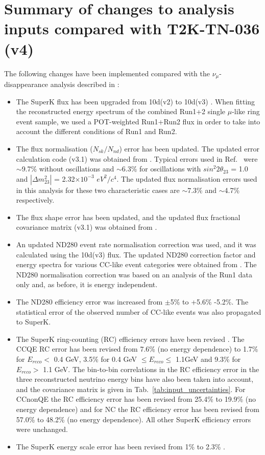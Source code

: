 \section {Summary of changes to analysis inputs compared with T2K-TN-036 (v4) }
\label{sec:analysis_modifications}

The following changes have been implemented compared with the $\nu_{\mu}$-disappearance analysis 
described in \cite{OurRun1DisappAnalysis}:

\begin{itemize}
\item
  The SuperK flux has been upgraded from 10d(v2) to 10d(v3) \cite{UpdatedFlux}.
  When fitting the reconstructed energy spectrum of the combined Run1+2 single $\mu$-like ring event sample,
  we used a POT-weighted Run1+Run2 flux in order to take into account the different conditions of Run1 and Run2.
\item
  The flux normalisation ($N_{sk}/N_{nd}$) error has been updated. 
  The updated error calculation code (v3.1) was obtained from \cite{UpdatedFluxNormError}.
  Typical errors used in Ref.\ \cite{OurRun1DisappAnalysis} were
  $\sim$9.7\% without oscillations and
  $\sim$6.3\% for oscillations with 
  $sin^{2}2\theta_{23}$ = 1.0 and $|\Delta m^{2}_{23}|$ = 2.32$\times10^{-3}$ $eV^{2}/c^{4}$.
  The updated flux normalisation errors used in this analysis for these two characteristic cases are 
  $\sim$7.3\% and $\sim$4.7\% respectively.
\item
  The flux shape error has been updated, and
  the updated flux fractional covariance matrix (v3.1) was obtained from \cite{UpdatedFluxNormError}.
\item
  An updated ND280 event rate normalisation correction was used, and it was calculated using the 10d(v3) flux.
  The updated ND280 correction factor and energy spectra for various CC-like event categories 
  were obtained from \cite{UpdatedND280Histograms}.
  The ND280 normalisation correction was based on an analysis of the Run1 data only and,
  as before, it is energy independent.
\item
  The ND280 efficiency error was increased from $\pm$5\% to +5.6\% -5.2\%. The statistical error of the
  observed number of CC-like events was also propagated to SuperK.
\item
  The SuperK ring-counting (RC) efficiency errors have been revised \cite{UpdatedSuperkEfficiencyErrors}.
  The CCQE RC error has been revised from 7.6\% (no energy dependence) to
  1.7\% for $E_{reco}<$ 0.4 GeV, 3.5\% for  0.4 GeV $\leq E_{reco} \leq$ 1.1GeV
  and 9.3\% for  $E_{reco}>$ 1.1 GeV. The bin-to-bin correlations in the RC efficiency error in
  the three reconstructed neutrino energy bins have also been taken into account, and
  the covariance matrix is given in Tab.\ \ref{tab:input_uncertainties}.
  For CCnonQE the RC efficiency error has been revised from 25.4\% to 19.9\% (no energy dependence) 
  and for NC the RC efficiency error has been revised from 57.0\% to 48.2\% (no energy dependence).
  All other SuperK efficiency errors were unchanged.
\item
  The SuperK energy scale error has been revised from 1\% to 2.3\% \cite{UpdatedSuperkEnergyScaleError}.
\end{itemize}


